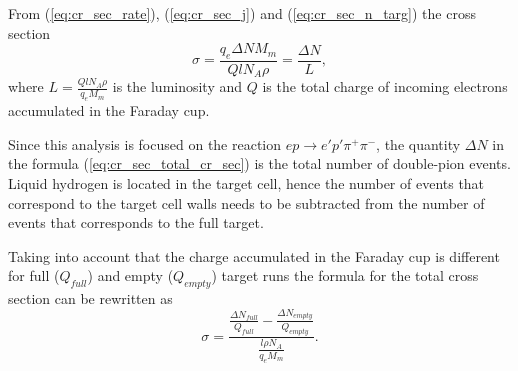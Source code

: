 From (\ref{eq:cr_sec_rate}), (\ref{eq:cr_sec_j}) and (\ref{eq:cr_sec_n_targ}) the cross section
\begin{equation}
\sigma =\frac{q_{e}\Delta NM_{m}}{QlN_{A}\rho }=\frac{\Delta N}{L},
\label{eq:cr_sec_total_cr_sec}
\end{equation}  
where $L=\frac{QlN_{A}\rho }{q_{e}M_{m}}$ is the luminosity and $Q$ is the total charge of incoming electrons accumulated in the Faraday cup.

Since this analysis is focused on the reaction $e p \rightarrow e' p' \pi^{+} \pi^{-}$, the quantity  $\Delta N$ in the formula (\ref{eq:cr_sec_total_cr_sec}) is the total number of double-pion events. Liquid hydrogen is located in the target cell, hence the number of events that correspond to the target cell walls needs to be subtracted from the number of events that corresponds to the full target. 

Taking into account that the charge accumulated in the Faraday cup is different for full ($Q_{full}$) and empty ($Q_{empty}$) target runs the formula for the total  cross section can be rewritten as
\begin{equation}
\sigma =\frac{\frac{\Delta N_{full}}{Q_{full}}- \frac{\Delta N_{empty}}{Q_{empty}}}{\frac{l\rho N_{A}}{q_{e}M_{m}}}.
\label{eq:cr_sec_total_cr_sec2}
\end{equation}  

